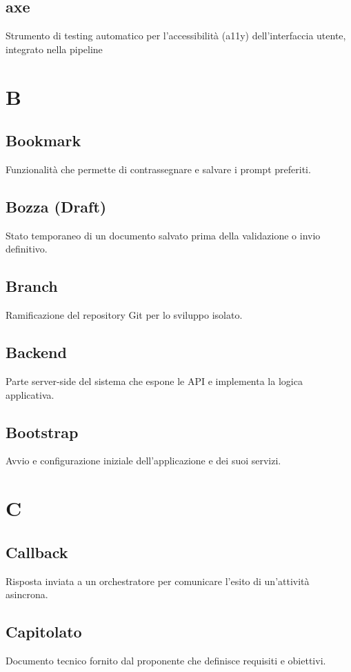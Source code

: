 \documentclass[a4paper,12pt]{article}
\begin{document}
\subsection{axe}
Strumento di testing automatico per l'accessibilità (a11y) dell'interfaccia utente, integrato nella pipeline 

\section{B}
\subsection{Bookmark}
Funzionalità che permette di contrassegnare e salvare i prompt preferiti.

\subsection{Bozza (Draft)}
Stato temporaneo di un documento salvato prima della validazione o invio definitivo.

\subsection{Branch}
Ramificazione del repository Git per lo sviluppo isolato.

\subsection{Backend}
Parte server-side del sistema che espone le API e implementa la logica applicativa.

\subsection{Bootstrap}
Avvio e configurazione iniziale dell'applicazione e dei suoi servizi.


\section{C}

\subsection{Callback}
Risposta inviata a un orchestratore per comunicare l'esito di un'attività asincrona.
\subsection{Capitolato}
Documento tecnico fornito dal proponente che definisce requisiti e obiettivi.
\end{document}
